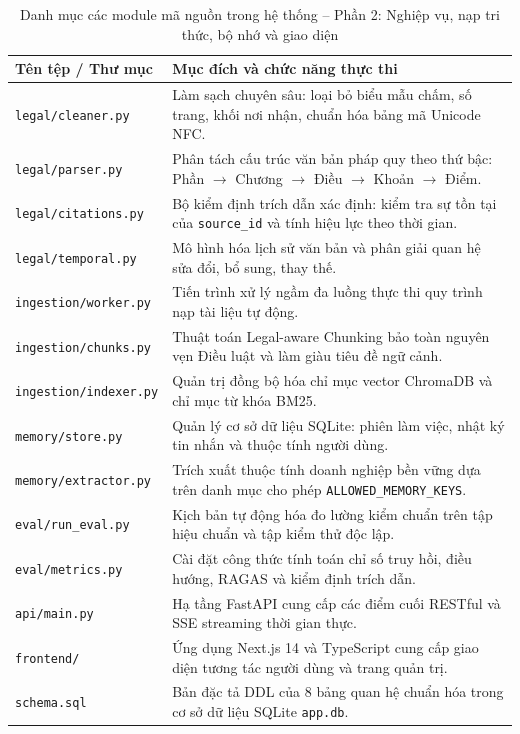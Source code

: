 \begin{table}[htbp]
\centering
\caption{Danh mục các module mã nguồn trong hệ thống -- Phần 2: Nghiệp vụ, nạp tri thức, bộ nhớ và giao diện}
\label{tab:source_files_part2}
\renewcommand{\arraystretch}{1.25}
\begin{tabularx}{\textwidth}{L{4.8cm} Y}
\toprule
{}\color{white}\textbf{Tên tệp / Thư mục} & \color{white}\textbf{Mục đích và chức năng thực thi} \\
\midrule
\texttt{legal/cleaner.py} & Làm sạch chuyên sâu: loại bỏ biểu mẫu chấm, số trang, khối nơi nhận, chuẩn hóa bảng mã Unicode NFC. \\
\texttt{legal/parser.py} & Phân tách cấu trúc văn bản pháp quy theo thứ bậc: Phần $\to$ Chương $\to$ Điều $\to$ Khoản $\to$ Điểm. \\
\texttt{legal/citations.py} & Bộ kiểm định trích dẫn xác định: kiểm tra sự tồn tại của \texttt{source\_id} và tính hiệu lực theo thời gian. \\
\texttt{legal/temporal.py} & Mô hình hóa lịch sử văn bản và phân giải quan hệ sửa đổi, bổ sung, thay thế. \\
\texttt{ingestion/worker.py} & Tiến trình xử lý ngầm đa luồng thực thi quy trình nạp tài liệu tự động. \\
\texttt{ingestion/chunks.py} & Thuật toán Legal-aware Chunking bảo toàn nguyên vẹn Điều luật và làm giàu tiêu đề ngữ cảnh. \\
\texttt{ingestion/indexer.py} & Quản trị đồng bộ hóa chỉ mục vector ChromaDB và chỉ mục từ khóa BM25. \\
\texttt{memory/store.py} & Quản lý cơ sở dữ liệu SQLite: phiên làm việc, nhật ký tin nhắn và thuộc tính người dùng. \\
\texttt{memory/extractor.py} & Trích xuất thuộc tính doanh nghiệp bền vững dựa trên danh mục cho phép \texttt{ALLOWED\_MEMORY\_KEYS}. \\
\texttt{eval/run\_eval.py} & Kịch bản tự động hóa đo lường kiểm chuẩn trên tập hiệu chuẩn và tập kiểm thử độc lập. \\
\texttt{eval/metrics.py} & Cài đặt công thức tính toán chỉ số truy hồi, điều hướng, RAGAS và kiểm định trích dẫn. \\
\texttt{api/main.py} & Hạ tầng FastAPI cung cấp các điểm cuối RESTful và SSE streaming thời gian thực. \\
\texttt{frontend/} & Ứng dụng Next.js 14 và TypeScript cung cấp giao diện tương tác người dùng và trang quản trị. \\
\texttt{schema.sql} & Bản đặc tả DDL của 8 bảng quan hệ chuẩn hóa trong cơ sở dữ liệu SQLite \texttt{app.db}. \\
\bottomrule
\end{tabularx}
\end{table}

